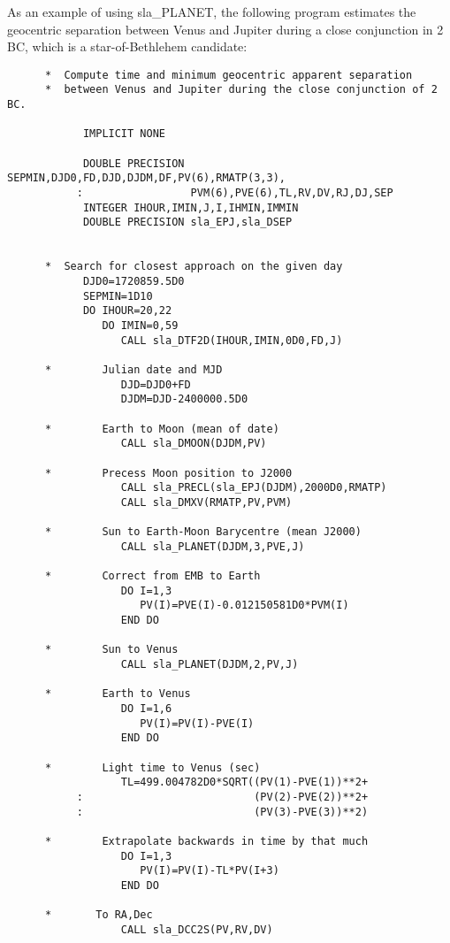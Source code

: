 \documentclass[11pt,twoside]{article}
\begin{document}
As an example of using
sla\_PLANET,
the following program estimates the geocentric separation
between Venus and Jupiter during a close conjunction
in 2\,BC, which is a star-of-Bethlehem candidate:
\goodbreak
\begin{verbatim}
      *  Compute time and minimum geocentric apparent separation
      *  between Venus and Jupiter during the close conjunction of 2 BC.

            IMPLICIT NONE

            DOUBLE PRECISION SEPMIN,DJD0,FD,DJD,DJDM,DF,PV(6),RMATP(3,3),
           :                 PVM(6),PVE(6),TL,RV,DV,RJ,DJ,SEP
            INTEGER IHOUR,IMIN,J,I,IHMIN,IMMIN
            DOUBLE PRECISION sla_EPJ,sla_DSEP


      *  Search for closest approach on the given day
            DJD0=1720859.5D0
            SEPMIN=1D10
            DO IHOUR=20,22
               DO IMIN=0,59
                  CALL sla_DTF2D(IHOUR,IMIN,0D0,FD,J)

      *        Julian date and MJD
                  DJD=DJD0+FD
                  DJDM=DJD-2400000.5D0

      *        Earth to Moon (mean of date)
                  CALL sla_DMOON(DJDM,PV)

      *        Precess Moon position to J2000
                  CALL sla_PRECL(sla_EPJ(DJDM),2000D0,RMATP)
                  CALL sla_DMXV(RMATP,PV,PVM)

      *        Sun to Earth-Moon Barycentre (mean J2000)
                  CALL sla_PLANET(DJDM,3,PVE,J)

      *        Correct from EMB to Earth
                  DO I=1,3
                     PV(I)=PVE(I)-0.012150581D0*PVM(I)
                  END DO

      *        Sun to Venus
                  CALL sla_PLANET(DJDM,2,PV,J)

      *        Earth to Venus
                  DO I=1,6
                     PV(I)=PV(I)-PVE(I)
                  END DO

      *        Light time to Venus (sec)
                  TL=499.004782D0*SQRT((PV(1)-PVE(1))**2+
           :                           (PV(2)-PVE(2))**2+
           :                           (PV(3)-PVE(3))**2)

      *        Extrapolate backwards in time by that much
                  DO I=1,3
                     PV(I)=PV(I)-TL*PV(I+3)
                  END DO

      *       To RA,Dec
                  CALL sla_DCC2S(PV,RV,DV)


\end{verbatim}
\end{document}
